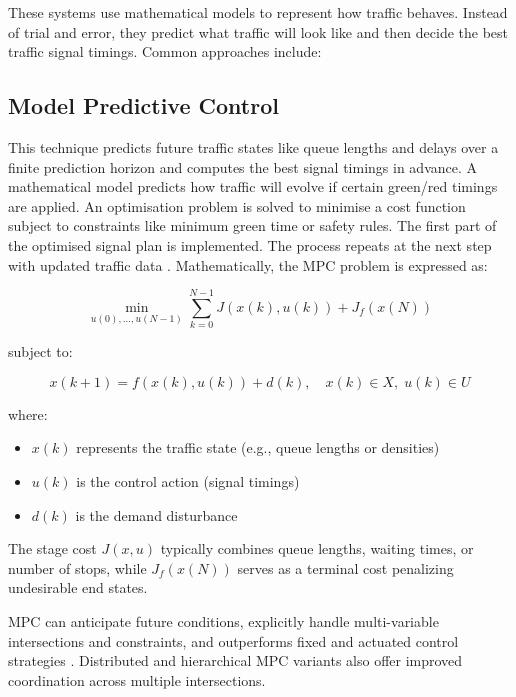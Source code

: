 ﻿\documentclass[11pt, a4paper]{report}
\begin{document}
These systems use mathematical models to represent how traffic behaves. Instead of trial and error, they predict what traffic will look like and then decide the best traffic signal timings. Common approaches include:

\subsection{Model Predictive Control}

This technique predicts future traffic states like queue lengths and delays over a finite prediction horizon and computes the best signal timings in advance. A mathematical model predicts how traffic will evolve if certain green/red timings are applied. An optimisation problem is solved to minimise a cost function subject to constraints like minimum green time or safety rules. The first part of the optimised signal plan is implemented. The process repeats at the next step with updated traffic data \cite{ye2019survey}. Mathematically, the MPC problem is expressed as:

\begin{equation}
\min_{u(0), \dots, u(N-1)} \sum_{k=0}^{N-1} J(x(k), u(k)) + J_f(x(N))
\label{eq:mpc-objective}
\end{equation}

subject to:

\begin{equation}
x(k+1) = f(x(k), u(k)) + d(k), \quad x(k) \in X, \; u(k) \in U
\label{eq:mpc-constraint}
\end{equation}

where:

\begin{itemize}
    \item $x(k)$ represents the traffic state (e.g., queue lengths or densities)
    \item $u(k)$ is the control action (signal timings)
    \item $d(k)$ is the demand disturbance
\end{itemize}

The stage cost $J(x,u)$ typically combines queue lengths, waiting times, or number of stops, while $J_f(x(N))$ serves as a terminal cost penalizing undesirable end states.

MPC can anticipate future conditions, explicitly handle multi-variable intersections and constraints, and outperforms fixed and actuated control strategies \cite{ye2019survey}. Distributed and hierarchical MPC variants also offer improved coordination across multiple intersections.
\end{document}
